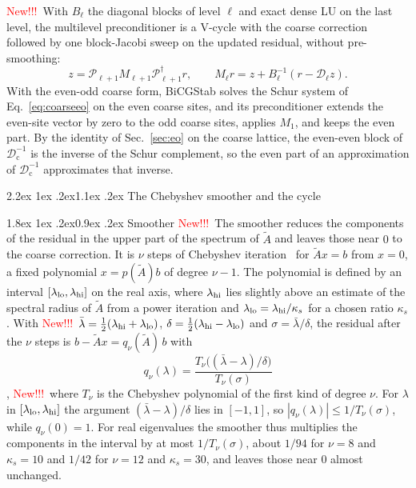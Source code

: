 \documentclass[11pt,a4paper]{article}
\makeatletter
\newif\ifshownew \shownewtrue
\DeclareRobustCommand\New{\ifshownew\textcolor{red}{New!!!}\ \else\ignorespaces\fi}
\renewcommand\subsection{\@startsection{subsection}{2}{\z@}%
  {2.2ex \@plus 1ex \@minus .2ex}{1.1ex \@plus .2ex}%
  {\centering\normalfont\small\bfseries}}
\renewcommand\subsubsection{\@startsection{subsubsection}{3}{\z@}%
  {1.8ex \@plus 1ex \@minus .2ex}{0.9ex \@plus .2ex}%
  {\centering\normalfont\small\bfseries\itshape}}
\numberwithin{equation}{section}
\newcommand{\dg}{^{\dagger}}
\newcommand{\Pro}{\mathcal P}
\newcommand{\Dc}{\mathcal D_{\mathrm c}}
\makeatother
\begin{document}
\New With $B_\ell$ the diagonal blocks of level $\ell$ and exact dense LU on the last level, the
multilevel preconditioner is a V-cycle with the coarse correction followed by one block-Jacobi sweep
on the updated residual, without pre-smoothing:
\begin{equation}
z=\Pro_{\ell+1}M_{\ell+1}\Pro_{\ell+1}\dg r,\qquad
M_\ell r=z+B_\ell^{-1}(r-\mathcal D_\ell z).
\end{equation}
With the even-odd coarse form, BiCGStab solves the Schur system of Eq.~\eqref{eq:coarseeo} on the
even coarse sites, and its preconditioner extends the even-site vector by zero to the odd coarse
sites, applies $M_1$, and keeps the even part. By the identity of Sec.~\ref{sec:eo} on the coarse
lattice, the even-even block of $\Dc^{-1}$ is the inverse of the Schur complement, so the even part
of an approximation of $\Dc^{-1}$ approximates that inverse.

\subsection{The Chebyshev smoother and the cycle}
\label{sec:smoother}

\subsubsection{Smoother}
\New The smoother reduces the components of the residual in the upper part of the spectrum of
$\tilde A$ and leaves those near $0$ to the coarse correction. It is $\nu$ steps of Chebyshev
iteration~\cite{Manteuffel,Saad} for $\tilde Ax=b$ from $x=0$, a fixed polynomial $x=p(\tilde A)b$
of degree $\nu-1$. The polynomial is defined by an interval $[\lambda_{\rm lo},\lambda_{\rm hi}]$ on
the real axis, where $\lambda_{\rm hi}$ lies slightly above an estimate of the spectral radius of
$\tilde A$ from a power iteration and $\lambda_{\rm lo}=\lambda_{\rm hi}/\kappa_s$ for a chosen
ratio $\kappa_s$. With \New $\bar\lambda=\frac12(\lambda_{\rm hi}+\lambda_{\rm lo})$,
$\delta=\frac12(\lambda_{\rm hi}-\lambda_{\rm lo})$ and $\sigma=\bar\lambda/\delta$, the residual after
the $\nu$ steps is $b-\tilde Ax=q_\nu(\tilde A)\,b$ with
\begin{equation*}
q_\nu(\lambda)=\frac{T_\nu\big((\bar\lambda-\lambda)/\delta\big)}{T_\nu(\sigma)}
\end{equation*}
\cite{Saad}, \New where $T_\nu$ is the Chebyshev polynomial of the first kind of degree $\nu$. For $\lambda$ in
$[\lambda_{\rm lo},\lambda_{\rm hi}]$ the argument $(\bar\lambda-\lambda)/\delta$ lies in $[-1,1]$, so
$|q_\nu(\lambda)|\le1/T_\nu(\sigma)$, while $q_\nu(0)=1$. For real eigenvalues the smoother thus
multiplies the components in the interval by at most $1/T_\nu(\sigma)$, about $1/94$ for $\nu=8$
and $\kappa_s=10$ and $1/42$ for $\nu=12$ and $\kappa_s=30$, and leaves those near $0$ almost
unchanged.
\end{document}

